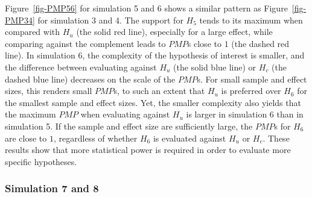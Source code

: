 \documentclass[
]{interact}
\begin{document}
                    Figure~\ref{fig-PMP56} for simulation 5 and 6 shows a similar pattern as
                    Figure~\ref{fig-PMP34} for simulation 3 and 4. The support for \(H_5\)
                    tends to its maximum when compared with \(H_u\) (the solid red line),
                    especially for a large effect, while comparing against the complement
                    leads to \(PMP\)s close to \(1\) (the dashed red line). In simulation 6,
                    the complexity of the hypothesis of interest is smaller, and the
                    difference between evaluating against \(H_u\) (the solid blue line) or
                    \(H_c\) (the dashed blue line) decreases on the scale of the \(PMP\)s.
                    For small sample and effect sizes, this renders small \(PMP\)s, to such
                    an extent that \(H_u\) is preferred over \(H_6\) for the smallest sample
                    and effect sizes. Yet, the smaller complexity also yields that the
                    maximum \(PMP\) when evaluating against \(H_u\) is larger in simulation
                    6 than in simulation 5. If the sample and effect size are sufficiently
                    large, the \(PMP\)s for \(H_6\) are close to \(1\), regardless of
                    whether \(H_6\) is evaluated against \(H_u\) or \(H_c\). These results
                    show that more statistical power is required in order to evaluate more
                    specific hypotheses.
                    
                    \hypertarget{simulation-7-and-8}{%
                      \subsubsection{Simulation 7 and 8}\label{simulation-7-and-8}}
                    
\end{document}
